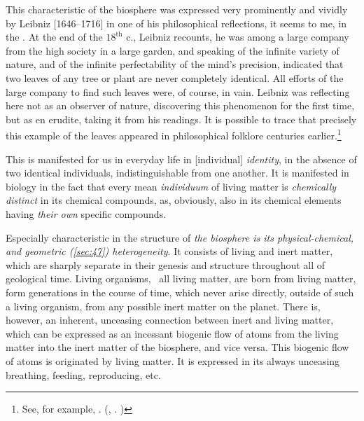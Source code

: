 This characteristic of the biosphere was expressed very prominently and vividly
by Leibniz [1646--1716] in one of his philosophical reflections, it seems to
me, in the .  At the end of the $18^\mathrm{th}$ c., Leibniz recounts, he was among a
large company from the high society in a large garden, and speaking of the
infinite variety of nature, and of the infinite perfectability of the mind's
precision, indicated that two leaves of
any tree or plant are never completely identical.  All efforts of the large
company to find such leaves were, of course, in vain.  Leibniz was reflecting
here not as an observer of nature, discovering this phenomenon for the first
time, but as en erudite, taking it from his readings.  It is possible to trace
that precisely this example of the leaves appeared in philosophical folklore
centuries earlier.\footnote{
	See, for example, \cite[кн.~2,
	с.~54]{carus1913prirode}\nocite{carus1936prirode, carus1851nature}.
	(\Eg, \cite[book~2]{carus1851nature}. )
}

This is manifested for us in everyday life in [individual]
\emph{identity}, in the absence of two identical
individuals, indistinguishable from one another.  It is manifested in biology
in the fact that every mean \emph{individuum} of living
matter is \emph{chemically distinct} in its chemical compounds, as, obviously,
also in its chemical elements having \emph{their own} specific compounds.


\Section %
Especially characteristic in the structure of \emph{the biosphere is its
physical-chemical, and geometric \emph{(\autoref{sec:47})} heterogeneity}.  It
consists of living and inert matter, which are sharply separate in their
genesis and structure throughout all of geological time.  Living organisms,
\ie\ all living matter, are born from living matter,  form
generations in the course of time, which never arise directly, outside of such
a living organism, from any possible inert matter on the planet.  There is,
however, an inherent, unceasing connection between inert and living matter, which can be expressed
as an incessant biogenic flow of atoms from the living matter into the inert
matter of the biosphere, and vice versa.  This biogenic flow of atoms is
originated by living matter.  It is expressed in its always unceasing
breathing, feeding, reproducing, etc.

